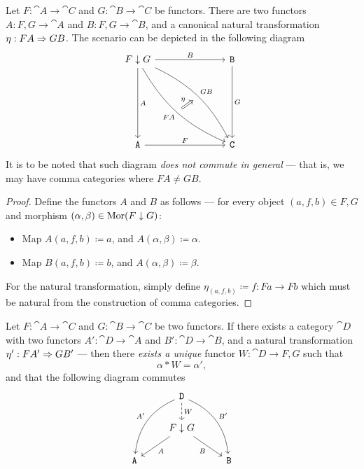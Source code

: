 \begin{proposition}
    \label{prop:comma-cat-proj-functors}
    Let \(F: \cat A \to \cat C\) and \(G: \cat B \to \cat C\) be functors. There are
    two functors \(A: F \comma G \to \cat A\) and \(B: F \comma G \to \cat B\), and
    a canonical natural transformation \(\eta: F A \Rightarrow G B\). The scenario can be
    depicted in the following diagram
    \[
        \begin{tikzcd}
            F \comma G
            \ar[rrr, "B"]
            \ar[rrrdddd, bend left=18, "G B", ""'{name=GB}]
            \ar[rrrdddd, bend right=18, "F A"', ""{name=FA}]
            \ar[dddd, "A"]
            & & & \cat B \ar[dddd, "G"] \\ \\ \\ \\
            \cat A \ar[rrr, "F"] & & &\cat C
            \ar[Rightarrow, "\eta", from=FA, to=GB]
        \end{tikzcd}
    \]
    It is to be noted that such diagram \emph{does not commute in general} --- that
    is, we may have comma categories where \(FA \neq G B\).
\end{proposition}

\begin{proof}
    Define the functors \(A\) and \(B\) as follows --- for every object
    \((a, f, b) \in F \comma G\) and morphism
    \((\alpha, \beta) \in \operatorname{Mor}(F \downarrow G)\):
    \begin{itemize}\setlength\itemsep{0em}
        \item Map \(A(a, f, b) \coloneq a\), and \(A(\alpha, \beta) \coloneq \alpha\).
        \item Map \(B(a, f, b) \coloneq b\), and \(A(\alpha, \beta) \coloneq \beta\).
    \end{itemize}
    For the natural transformation, simply define
    \(\eta_{(a, f, b)} \coloneq f: F a \to F b\) which must be natural from the
    construction of comma categories.
\end{proof}

\begin{proposition}
    \label{prop:comma-cat-univ-property}
    Let \(F: \cat A \to \cat C\) and \(G: \cat B \to \cat C\) be two functors. If
    there exists a category \(\cat D\) with two functors \(A': \cat D \to \cat A\)
    and \(B': \cat D \to \cat B\), and a natural transformation
    \(\eta': F A' \Rightarrow G B'\) --- then there \emph{exists a unique} functor
    \(W: \cat D \to F \comma G\) such that
    \[
        \alpha * W = \alpha',
    \]
    and that the following diagram commutes
    \[
        \begin{tikzcd}
            &\cat D \ar[drd, bend left, "B'"] \ar[dld, bend right, "A'"']
            \ar[d, dashed, "W"]
            & \\
            &F \comma G \ar[dr, "B"'] \ar[dl, "A"]& \\
            \cat A & &\cat B
        \end{tikzcd}
    \]
\end{proposition}

